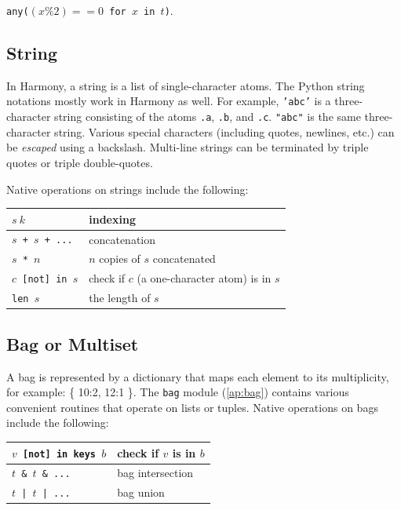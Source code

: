 \documentclass{report}
\begin{document}
\texttt{any($(x \% 2) == 0$ for $x$ in $t$)}.

\subsection*{String}

In Harmony, a string is a list of single-character atoms.
The Python string notations mostly work in Harmony as well.
For example, \texttt{'abc'} is a three-character string
consisting of the atoms \texttt{.a}, \texttt{.b}, and
\texttt{.c}.
\texttt{"abc"} is the same three-character string.
Various special characters (including quotes, newlines, etc.)
can be \emph{escaped} using a backslash.
Multi-line strings can be terminated by triple quotes or
triple double-quotes.

Native operations on strings include the following:

\begin{center}
\begin{tabular}{|l|l|}
\hline
\texttt{$s~k$} & indexing \\
\hline
\texttt{$s$ + $s$ + ...} & concatenation \\
\hline
\texttt{$s$ * $n$} & $n$ copies of $s$ concatenated \\
\hline
\texttt{$c$ [not] in $s$} & check if $c$ (a one-character atom) is in $s$ \\
\hline
\texttt{len $s$} & the length of $s$ \\
\hline
\end{tabular}
\end{center}

\subsection*{Bag or Multiset}

A bag is represented by a dictionary that maps each element to its
multiplicity, for example: \{ 10:2, 12:1 \}.
The \texttt{bag} module (\autoref{ap:bag}) contains various
convenient routines that operate on lists or tuples.
Native operations on bags include the following:

\begin{center}
\begin{tabular}{|l|l|}
\hline
\texttt{$v$ [not] in keys $b$} & check if $v$ is in $b$ \\
\hline
\texttt{$t$ \& $t$ \& ...} & bag intersection\\
\hline
\texttt{$t$ | $t$ | ...} & bag union \\
\hline
\end{tabular}
\end{center}
\end{document}

